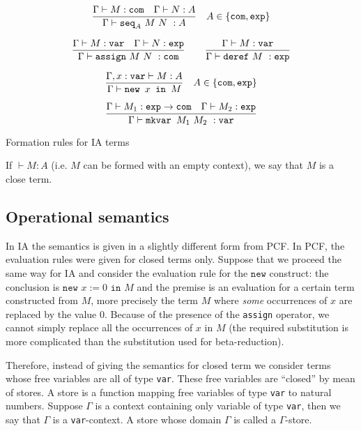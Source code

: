 \begin{table}[htbp]
$$ \frac{\displaystyle \Gamma \vdash M : \texttt{com} \quad \Gamma \vdash N :A}{\Gamma \vdash \texttt{seq}_A \ M\ N\ : A} \quad A \in \{ \texttt{com}, \texttt{exp}\}$$

$$ \frac{\displaystyle \Gamma \vdash M : \texttt{var} \quad \Gamma \vdash N : \texttt{exp}}{\Gamma \vdash \texttt{assign}\ M\ N\ : \texttt{com}}
\qquad
 \frac{\displaystyle \Gamma \vdash M : \texttt{var}}{\Gamma \vdash \texttt{deref}\ M\ : \texttt{exp}}$$

$$ \frac{\displaystyle \Gamma, x : \texttt{var} \vdash M : A}{\Gamma \vdash \texttt{new } x \texttt{ in } M} \quad A \in \{ \texttt{com}, \texttt{exp}\}$$

$$ \frac{\displaystyle \Gamma \vdash M_1 : \texttt{exp} \rightarrow \texttt{com} \quad \Gamma \vdash M_2 : \texttt{exp}}{\Gamma \vdash \texttt{mkvar } M_1\ M_2\ : \texttt{var}}$$

\caption{Formation rules for IA terms}
\label{tab:ia_formrules}
\end{table}

If $\vdash M : A$ (i.e. $M$ can be formed with an empty context), we say that $M$ is a close term.

\subsection{Operational semantics}

In IA the semantics is given in a slightly different form from PCF.
In PCF, the evaluation rules were given for closed terms only. Suppose that we
proceed the same way for IA and consider the evaluation rule for the $\texttt{new}$ construct:
the conclusion is $\texttt{new } x:=0 \texttt{ in } M$ and the premise
is an evaluation for a certain term constructed from $M$, more precisely the term $M$
where \emph{some} occurrences of $x$ are replaced by the value $0$.
Because of the presence of the \texttt{assign} operator, we cannot simply replace all
the occurrences of $x$ in $M$ (the required substitution is  more complicated
than the substitution used for beta-reduction).


Therefore, instead of giving the semantics for closed term we consider terms
whose free variables are all of type \texttt{var}. These free variables are ``closed'' by mean of
stores. A store is a function mapping free variables of type \texttt{var} to natural numbers.
Suppose $\Gamma$ is a context containing only variable of type \texttt{var}, then we say that
$\Gamma$ is a \texttt{var}-context. A store whose domain $\Gamma$ is called a $\Gamma$-store.

